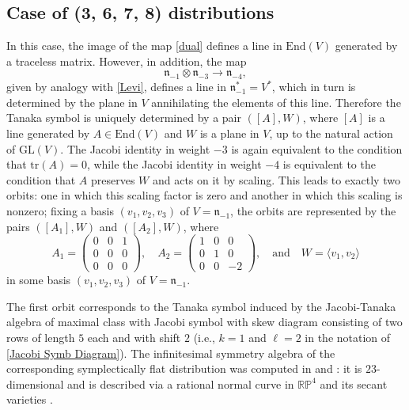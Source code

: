 \documentclass[11pt,letterpaper]{amsart}
\numberwithin{equation}{section}
\begin{document}
\subsection{Case of (3, 6, 7, 8) distributions}
In this case, the image of the map \eqref{dual} defines a line in $\mathrm{End}(V)$ generated by a traceless matrix. However, in addition, the map 
\begin{equation}
\label{Levi13}
\mathfrak{n}_{-1}\otimes \mathfrak {n}_{-3} \to \mathfrak n_{-4},
\end{equation}
given by analogy with \eqref{Levi},  defines a line in $\mathfrak n_{-1}^*=V^*$, which in turn is determined by the  plane in $V$ annihilating the elements of this line. Therefore the Tanaka symbol is uniquely determined by a pair $([A], W)$, where $[A]$ is a line generated by $A\in \mathrm {End}(V)$ and $W$ is a plane in $V$, up to the natural action of $\mathrm {GL}(V)$. The Jacobi identity in weight $-3$ is again equivalent to the condition that $\mathrm{tr}(A)=0$, while the Jacobi identity in weight $-4$ is equivalent to the condition that $A$ preserves $W$ and acts on it by scaling. This leads to exactly two orbits: one in which this scaling factor is zero and another in which this scaling is nonzero; fixing a basis $(v_1,v_2,v_3)$ of $V=\mathfrak n_{-1}$, the orbits are represented by the pairs $([A_1], W)$ and $([A_2], W)$, where
\begin{equation}
    A_1 = \begin{pmatrix}
        0 & 0 & 1 \\
        0 & 0 & 0 \\
        0 & 0 & 0
    \end{pmatrix},
    \quad
    A_2 = \begin{pmatrix}
        1 & 0 & 0 \\
        0 & 1 & 0 \\
        0 & 0 & -2
    \end{pmatrix},
    \quad \textrm{and}\quad W = \langle v_1,v_2\rangle
\end{equation}
in some basis $(v_1,v_2,v_3)$ of $V=\mathfrak n_{-1}$.


The first orbit corresponds to the Tanaka symbol induced by the Jacobi-Tanaka algebra of maximal class with Jacobi symbol with skew diagram consisting of two rows of length $5$ each and with shift $2$ (i.e., $k=1$ and $\ell=2$ in the notation of \eqref{Jacobi Symb Diagram}). The infinitesimal symmetry algebra of the corresponding symplectically flat distribution was computed in \cite{doubrov2008rank3} and \cite{DayDoubrovZelenko2026}: it is $23$-dimensional and is described via a rational normal curve in $\mathbb{RP}^4$ and its secant varieties \cite{doubrov2025large}.
\end{document}
